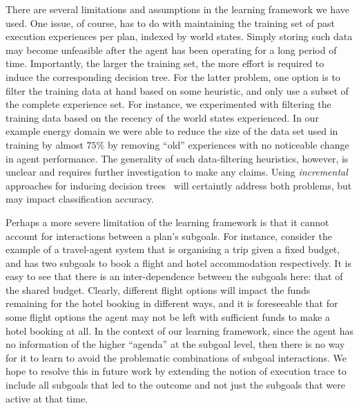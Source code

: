 There are several limitations and assumptions in the learning framework we have used.
One issue, of course, has to do with maintaining the training set of past execution experiences per plan, indexed by world states. Simply storing such data may become unfeasible after the agent has been operating for a long period of time. Importantly, the larger the training set, the more effort is required to induce the corresponding decision tree. For the latter problem, one option is to filter the training data at hand based on some heuristic, and only use a subset of the complete experience set. For instance, we experimented with filtering the training data based on the recency of the world states experienced. In our example energy domain we were able to reduce the size of the data set used in training by almost $75\%$ by removing ``old'' experiences with no noticeable change in agent performance. The generality of such data-filtering heuristics, however, is unclear and requires further investigation to make any claims. Using \emph{incremental} approaches for inducing decision trees~\cite{Swere06:Fast,Utgoff:ML89,Utgoff97Decision} will certaintly address both problems, but may impact classification accuracy.

Perhaps a more severe limitation of the learning framework is that it cannot account for interactions between a plan's subgoals. For instance, consider the example of a travel-agent system that is organising a trip given a fixed budget, and has two subgoals to book a flight and hotel accommodation respectively. It is easy to see that there is an inter-dependence between the subgoals here:  that of the shared budget. Clearly, different flight options will impact the funds remaining for the hotel booking in different ways, and it is foreseeable that for some flight options the agent may not be left with sufficient funds to make a hotel booking at all. In the context of our learning framework, since the  agent has no information of the higher ``agenda'' at the subgoal level, then there is no way for it to learn to avoid the problematic combinations of subgoal interactions. We hope to resolve this in future work by extending the notion of execution trace to include all subgoals that led to the outcome and not just the subgoals that were active at that time.

